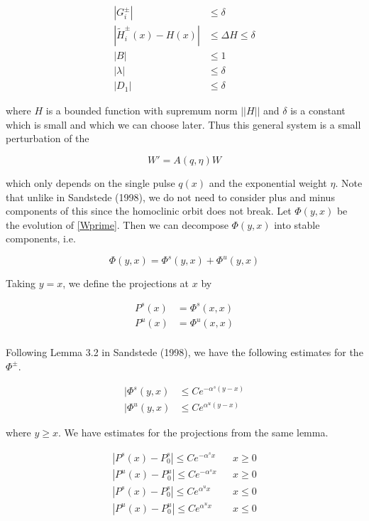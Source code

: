 \documentclass[12pt]{article}
\begin{document}
\begin{align*}
|G_i^\pm| & \leq \delta \\
|\tilde{H}_i^\pm(x) - H(x)| &\leq \Delta H \leq \delta\\
|B| &\leq 1 \\
|\lambda| &\leq \delta \\
|D_1| &\leq \delta
\end{align*}

where $H$ is a bounded function with supremum norm $||H||$ and $\delta$ is a constant which is small and which we can choose later. Thus this general system is a small perturbation of the 

\begin{equation}\label{Wprime}
W' = A(q, \eta) W
\end{equation}

which only depends on the single pulse $q(x)$ and the exponential weight $\eta$. Note that unlike in Sandstede (1998), we do not need to consider plus and minus components of this since the homoclinic orbit does not break. Let $\Phi(y, x)$ be the evolution of \eqref{Wprime}. Then we can decompose $\Phi(y, x)$ into stable components, i.e. 

\[
\Phi(y, x) = \Phi^s(y, x) + \Phi^u(y, x)
\]

Taking $y = x$, we define the projections at $x$ by

\begin{align*}
P^s(x) &= \Phi^s(x,x)\\
P^u(x) &= \Phi^u(x,x)\\
\end{align*}

Following Lemma 3.2 in Sandstede (1998), we have the following estimates for the $\Phi^\pm$.

\begin{align*}
|\Phi^s(y,x) &\leq Ce^{-\alpha^s(y-x)}\\
|\Phi^u(y,x) &\leq Ce^{\alpha^u(y-x)}
\end{align*}

where $y \geq x$. We have estimates for the projections from the same lemma.

\begin{align*}
|P^s(x) - P_0^s| \leq Ce^{-\alpha^s x} && x \geq 0 \\
|P^u(x) - P_0^u| \leq Ce^{-\alpha^s x} && x \geq 0 \\
|P^s(x) - P_0^s| \leq Ce^{\alpha^u x} && x \leq 0 \\
|P^u(x) - P_0^u| \leq Ce^{\alpha^u x} && x \leq 0 \\
\end{align*}
\end{document}
